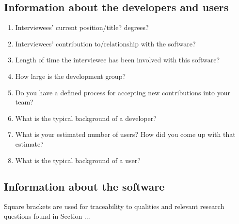 \documentclass[letterpaper,cleveref]{lipics-v2019}
\begin{document}
\subsection{Information about the developers and users} \citep{Jegatheesan2016}
\begin{enumerate}
\item Interviewees' current position/title? degrees?
\item Interviewees' contribution to/relationship with the software?
\item Length of time the interviewee has been involved with this software?
\item How large is the development group?
\item Do you have a defined process for accepting new contributions into your team?
\item What is the typical background of a developer?
\item What is your estimated number of users? How did you come up with that estimate?
\item What is the typical background of a user?
\end{enumerate}

\subsection{Information about the software}

Square brackets are used for traceability to qualities and relevant research
questions found in Section ...
\end{document}
